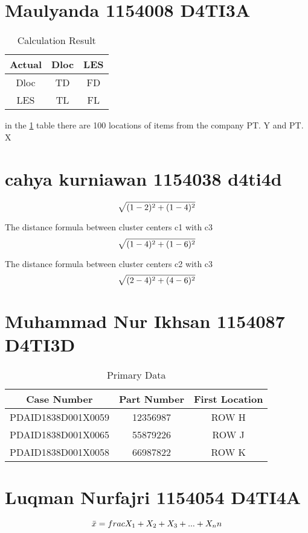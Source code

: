 \section{Maulyanda 1154008 D4TI3A}
\begin{table}[h]
    \centering
    \begin{tabular}{ccc}
    \hline
        Actual & Dloc & LES  \\
    \hline
         Dloc & TD & FD \\
         LES & TL & FL \\
    \hline
    \end{tabular}
    \caption{Calculation Result}
    \label{table1}
\end{table}

\par
in the \ref{table1} table there are 100 locations of items from the company PT. Y and PT. X

\section{cahya kurniawan 1154038 d4ti4d}
\par
\begin{equation}
\label{eq:1}
\sqrt{(1-2)\sp{2} + (1-4)\sp{2}}
    \end{equation}
\par
The distance formula between cluster centers c1 with c3
\begin{equation}
\label{eq:2}
\sqrt{(1-4)\sp{2} + (1-6)\sp{2}}
    \end{equation}
\par
The distance formula between cluster centers c2 with c3
\begin{equation}
\label{eq:3}
\sqrt{(2-4)\sp{2} + (4-6)\sp{2}}
    \end{equation}

\section{Muhammad Nur Ikhsan 1154087 D4TI3D}
\begin{table}[h]
\caption{Primary Data}
\centering
\begin{tabular}{ccc}
\hline
Case Number & Part Number & First Location \\
\hline
PDAID1838D001X0059 & 12356987 & ROW H \\
PDAID1838D001X0065 & 55879226 & ROW J \\
PDAID1838D001X0058 & 66987822 & ROW K \\
\hline
\end{tabular}
\label{table2}
\end{table}

\section{Luqman Nurfajri 1154054 D4TI4A}
\begin{equation}\label{eq:1}
\Bar{x}=frac{X_1+X_2+X_3+...+X_n}{n}
\end{equation}

